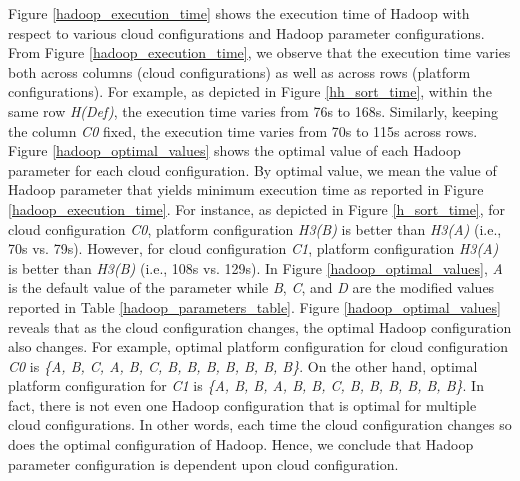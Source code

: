 \documentclass[3p]{elsarticle}
\begin{document}
Figure \ref{hadoop_execution_time} shows the execution time of Hadoop with respect to various cloud configurations and Hadoop parameter configurations. From Figure \ref{hadoop_execution_time}, we observe that the execution time varies both across columns (cloud configurations) as well as across rows (platform configurations). For example, as depicted in Figure \ref{hh_sort_time}, within the same row \textit{H(Def)}, the execution time varies from 76s to 168s. Similarly, keeping the column \textit{C0} fixed, the execution time varies from 70s to 115s across rows. Figure \ref{hadoop_optimal_values} shows the optimal value of each Hadoop parameter for each cloud configuration. By optimal value, we mean the value of Hadoop parameter that yields minimum execution time as reported in Figure \ref{hadoop_execution_time}. For instance, as depicted in Figure \ref{h_sort_time}, for cloud configuration \textit{C0}, platform configuration \textit{H3(B)} is better than \textit{H3(A)} (i.e., 70s vs. 79s). However, for cloud configuration \textit{C1}, platform configuration \textit{H3(A)} is better than \textit{H3(B)} (i.e., 108s vs. 129s). In Figure \ref{hadoop_optimal_values}, \textit{A} is the default value of the parameter while \textit{B}, \textit{C}, and \textit{D} are the modified values reported in Table \ref{hadoop_parameters_table}. Figure \ref{hadoop_optimal_values} reveals that as the cloud configuration changes, the optimal Hadoop configuration also changes. For example, optimal platform configuration for cloud configuration \textit{C0} is \textit{\{A, B, C, A, B, C, B, B, B, B, B, B, B\}}. On the other hand, optimal platform configuration for \textit{C1} is \textit{\{A, B, B, A, B, B, C, B, B, B, B, B, B\}}. In fact, there is not even one Hadoop configuration that is optimal for multiple cloud configurations. In other words, each time the cloud configuration changes so does the optimal configuration of Hadoop. Hence, we conclude that Hadoop parameter configuration is dependent upon cloud configuration. 
\end{document}

